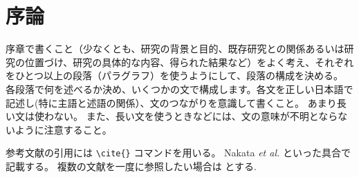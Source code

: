 \setcounter{chapter}{0}
\chapter{序論}
序章で書くこと（少なくとも、研究の背景と目的、既存研究との関係あるいは研究の位置づけ、研究の具体的な内容、得られた結果など）をよく考え、それぞれをひとつ以上の段落（パラグラフ）を使うようにして、段落の構成を決める。
各段落で何を述べるか決め、いくつかの文で構成します。各文を正しい日本語で記述し(特に主語と述語の関係）、文のつながりを意識して書くこと。
あまり長い文は使わない。
また、長い文を使うときなどには、文の意味が不明とならないように注意すること。

参考文献の引用には \verb|\cite{}| コマンドを用いる。
Nakata \textit{et al.} \cite{Nakata2003} といった具合で記載する。
複数の文献を一度に参照したい場合は \cite{Nakata2003,Fukuda2001} とする. 